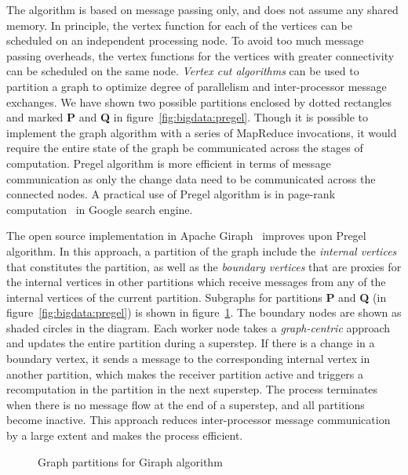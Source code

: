 The algorithm is based on message passing only, and does not assume any shared memory. In principle, the vertex function for each of
the vertices can be scheduled on an independent processing node. To avoid too much message passing overheads, the vertex functions 
for the vertices with greater connectivity can be scheduled on the same node. {\em Vertex cut algorithms} can be used to partition a 
graph to optimize degree of parallelism and inter-processor message exchanges. We have shown two possible partitions enclosed by
dotted rectangles and marked {\bf P} and {\bf Q} in figure~\ref{fig:bigdata:pregel}.
Though it is possible to implement the graph algorithm with a series of MapReduce invocations, it would require the entire state of 
the graph be communicated across the stages of computation. Pregel algorithm is more efficient in terms of message communication
as only the change data need to be communicated across the connected nodes.
A practical use of Pregel algorithm is in page-rank computation~\citep{Page:1999} in Google search engine.

The open source implementation in Apache Giraph~\citep{Tian:2013} improves upon Pregel algorithm.
In this approach, a partition of the graph include the {\em internal vertices} that constitutes the partition, as well as the {\em 
boundary vertices} that are proxies for the internal vertices in other partitions which receive messages from any of the internal
vertices of the current partition. Subgraphs for partitions {\bf P} and {\bf Q} (in figure~\ref{fig:bigdata:pregel}) is shown in 
figure~\ref{fig:bigdata:giraph}. The boundary nodes are shown as shaded circles in the diagram. Each worker node takes a {\em
graph-centric} approach and updates the entire partition during a superstep. If there is a change in a boundary vertex, it sends
a message to the corresponding internal vertex in another partition, which makes the receiver partition active and triggers a recomputation 
in the partition in the next superstep. The process terminates when there is no message flow at the end of a superstep, and all
partitions become inactive. This approach reduces inter-processor message communication by a large extent and makes the process
efficient.

\begin{figure}
	\centerline{
	}
	\caption{Graph partitions for Giraph algorithm}
	\label{fig:bigdata:giraph}
\end{figure}

